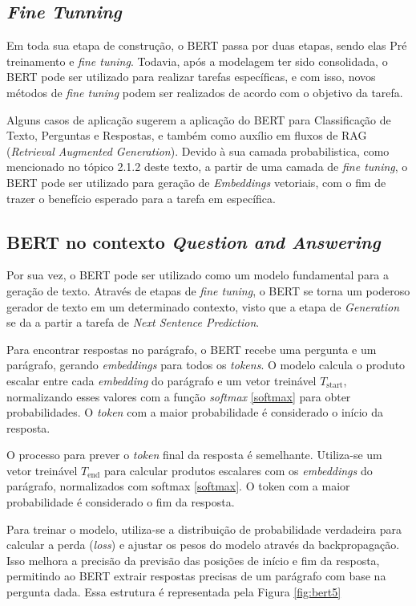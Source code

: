 \subsection{\textit{Fine Tunning}}
Em toda sua etapa de construção, o BERT passa por duas etapas, sendo elas Pré treinamento e \textit{fine tuning}. Todavia, após a modelagem ter sido consolidada, o BERT pode ser utilizado para realizar tarefas específicas, e com isso, novos métodos de \textit{fine tuning} podem ser realizados de acordo com o objetivo da tarefa.

Alguns casos de aplicação sugerem a aplicação do BERT para Classificação de Texto, Perguntas e Respostas, e também como auxílio em fluxos de RAG (\textit{Retrieval Augmented Generation}). Devido à sua camada probabilistica, como mencionado no tópico 2.1.2 deste texto, a partir de uma camada de \textit{fine tuning}, o BERT pode ser utilizado para geração de \textit{Embeddings} vetoriais, com o fim de trazer o benefício esperado para a tarefa em específica.

\subsection{BERT no contexto \textit{Question and Answering}}
Por sua vez, o BERT pode ser utilizado como um modelo fundamental para a geração de texto. Através de etapas de \textit{fine tuning}, o BERT se torna um poderoso gerador de texto em um determinado contexto, visto que a etapa de \textit{Generation} se da a partir a tarefa de \textit{Next Sentence Prediction}.

Para encontrar respostas no parágrafo, o BERT recebe uma pergunta e um parágrafo, gerando \textit{embeddings} para todos os \textit{tokens}. O modelo calcula o produto escalar entre cada \textit{embedding} do parágrafo e um vetor treinável \( T_{\text{start}} \), normalizando esses valores com a função \textit{softmax} \ref{softmax} para obter probabilidades. O \textit{token} com a maior probabilidade é considerado o início da resposta.

O processo para prever o \textit{token} final da resposta é semelhante. Utiliza-se um vetor treinável \( T_{\text{end}} \) para calcular produtos escalares com os \textit{embeddings} do parágrafo, normalizados com softmax \ref{softmax}. O token com a maior probabilidade é considerado o fim da resposta.

Para treinar o modelo, utiliza-se a distribuição de probabilidade verdadeira para calcular a perda (\textit{loss}) e ajustar os pesos do modelo através da backpropagação. Isso melhora a precisão da previsão das posições de início e fim da resposta, permitindo ao BERT extrair respostas precisas de um parágrafo com base na pergunta dada. Essa estrutura é representada pela Figura \ref{fig:bert5}

